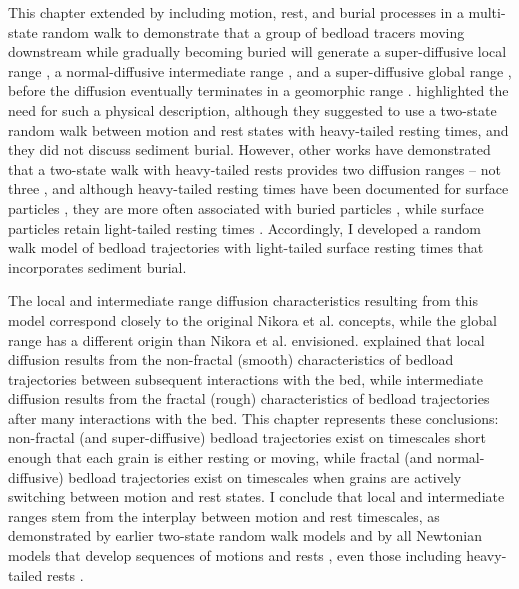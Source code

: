 This chapter extended \citet{Einstein1937} by including motion, rest, and burial processes in a multi-state random walk \citep{Weiss1994,Weeks1998} to demonstrate that a group of bedload tracers moving downstream while gradually becoming buried will generate a super-diffusive local range \citep{Martin2012,Fathel2016,Witz2018}, a normal-diffusive intermediate range \citep{Nakagawa1976,Yano1969}, and a super-diffusive global range \citep{Bradley2017, Bradley2010}, before the diffusion eventually terminates in a geomorphic range \citep{Hassan2017}.
\citet{Nikora2002} highlighted the need for such a physical description, although they suggested to use a two-state random walk between motion and rest states with heavy-tailed resting times, and they did not discuss sediment burial.
However, other works have demonstrated that a two-state walk with heavy-tailed rests provides two diffusion ranges -- not three \citep{Weeks1996,Fan2016}, and although heavy-tailed resting times have been documented for surface particles \citep{Liu2019,Fraccarollo2019}, they are more often associated with buried particles \citep{Martin2012,Martin2014,Voepel2013,Olinde2015,Pelosi2016, Pierce2020a}, while surface particles retain light-tailed resting times \citep{Einstein1937,Yano1969,Ancey2006,Nakagawa1976}.
Accordingly, I developed a random walk model of bedload trajectories with light-tailed surface resting times that incorporates sediment burial.

The local and intermediate range diffusion characteristics resulting from this model correspond closely to the original Nikora et al. concepts, while the global range has a different origin than Nikora et al. envisioned.
\citet{Nikora2001a} explained that local diffusion results from the non-fractal (smooth) characteristics of bedload trajectories between subsequent interactions with the bed,  while intermediate diffusion results from the fractal (rough) characteristics of bedload trajectories after many interactions with the bed.
This chapter represents these conclusions: non-fractal (and super-diffusive) bedload trajectories exist on timescales short enough that each grain is either resting or moving, while fractal (and normal-diffusive) bedload trajectories exist on timescales when grains are actively switching between motion and rest states.
I conclude that local and intermediate ranges stem from the interplay between motion and rest timescales, as demonstrated by earlier two-state random walk models \citep{Lisle1998,Lajeunesse2017} and by all Newtonian models that develop sequences of motions and rests \citep{Nikora2001a, Bialik2012}, even those including heavy-tailed rests \citep{Fan2016}.

